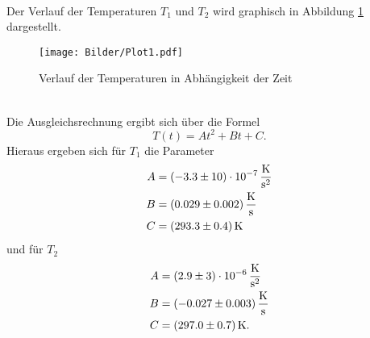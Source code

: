\\
Der Verlauf der Temperaturen $T_1$ und $T_2$ wird graphisch in Abbildung
\ref{fig:T1T2} dargestellt.
\begin{figure}[h]
  \centering
  \texttt{[image: Bilder/Plot1.pdf]}
  \caption{Verlauf der Temperaturen in Abhängigkeit der Zeit}
  \label{fig:T1T2}
\end{figure}
\\
Die Ausgleichsrechnung ergibt sich über die Formel
\begin{equation*}
  T(t) = At^2+Bt+C.
\end{equation*}
Hieraus ergeben sich für $T_1$ die Parameter
\begin{align*}
  A &= (-3.3 \pm 10) \cdot10^{-7}\,\si{\kelvin\per\square\second} \\
  B &= (0.029 \pm 0.002) \,\si{\kelvin\per\second} \\
  C &= (293.3 \pm 0.4) \,\si{\kelvin}
\end{align*}
und für $T_2$
\begin{align*}
  A &= (2.9 \pm 3) \cdot 10^{-6} \,\si{\kelvin\per\square\second}\\
  B &= (-0.027 \pm 0.003)  \,\si{\kelvin\per\second} \\
  C &= (297.0 \pm 0.7) \,\si{\kelvin}.
\end{align*}

